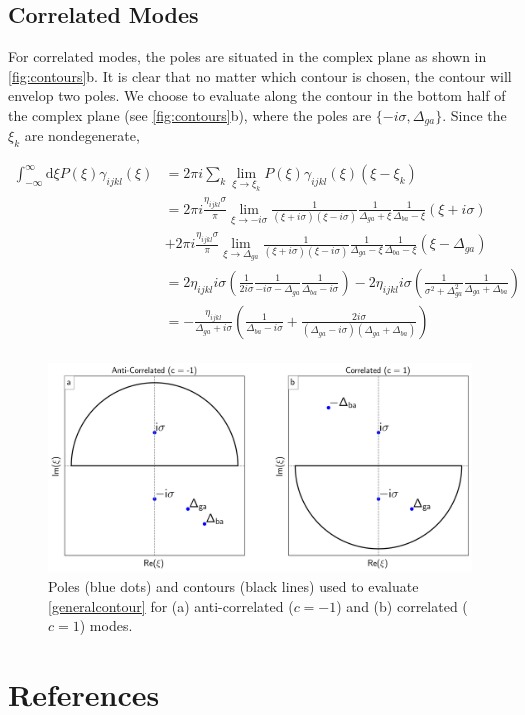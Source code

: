 \documentclass[aip, jcp, reprint, onecolumn, nofootinbib]{revtex4-2}
\begin{document}
\subsection{Correlated Modes}
For correlated modes, the poles are situated in the complex plane as shown in \autoref{fig:contours}b.
It is clear that no matter which contour is chosen, the contour will envelop two poles.
We choose to evaluate along the contour in the bottom half of the complex plane (see \autoref{fig:contours}b), where the poles are $\{-i\sigma, \Delta_{ga}\}$.
Since the $\xi_k$ are nondegenerate,
\begin{widetext}
	\begin{equation}
		\begin{split}
			\int_{-\infty}^\infty \mathrm{d}\xi P(\xi) \gamma_{ijkl}(\xi) &= 2\pi i \sum_k \lim_{\xi \rightarrow \xi_k} P(\xi) \gamma_{ijkl}(\xi) (\xi - \xi_k)\\
			&= 2\pi i \frac{\eta_{ijkl} \sigma}{\pi}  \lim_{\xi \rightarrow -i\sigma} \frac{1}{(\xi + i\sigma)(\xi - i\sigma)} \frac{1}{\Delta_{ga} + \xi} \frac{1}{\Delta_{ba} - \xi} \left(\xi + i \sigma\right) \\ 
			&+ 2\pi i \frac{\eta_{ijkl} \sigma}{\pi} \lim_{\xi \rightarrow \Delta_{ga}} \frac{1}{(\xi + i\sigma)(\xi - i\sigma)} \frac{1}{\Delta_{ga} - \xi} \frac{1}{\Delta_{ba} - \xi} \left(\xi - \Delta_{ga}\right)\\
			&= 2 \eta_{ijkl} i \sigma \left(\frac{1}{2 i \sigma} \frac{1}{-i \sigma - \Delta_{ga}} \frac{1}{\Delta_{ba} - i\sigma} \right) - 2\eta_{ijkl} i \sigma \left(\frac{1}{\sigma^2 + \Delta_{ga} ^2} \frac{1}{\Delta_{ga} + \Delta_{ba}} \right)\\
			&= -\frac{\eta_{ijkl}}{\Delta_{ga} + i \sigma} \left(\frac{1}{\Delta_{ba} - i \sigma} + \frac{2i\sigma}{(\Delta_{ga} - i \sigma)(\Delta_{ga} + \Delta_{ba})}\right)\\
		\end{split}
	\end{equation}
\end{widetext}


\begin{figure}[!htbp]
	\centering
	\includegraphics[width=6.675in]{figures/corr_contour.png}
	\caption{Poles (blue dots) and contours (black lines) used to evaluate \autoref{generalcontour} for (a) anti-correlated ($c=-1$) and (b) correlated ($c=1$) modes. 
	} 
	\label{fig:contours}
\end{figure}
\break

\section{References}

\end{document}
